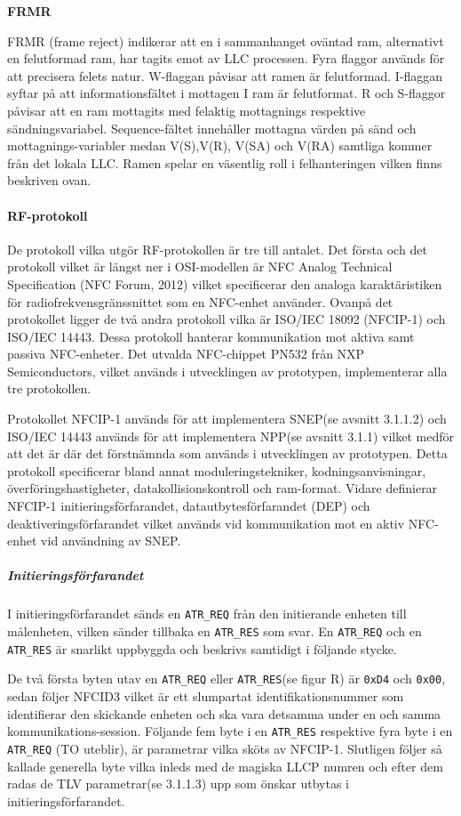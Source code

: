 \documentclass[11pt]{article}
\begin{document}

\textbf{FRMR}


FRMR (frame reject) indikerar att en i sammanhanget oväntad ram, alternativt en felutformad ram, har tagits emot av LLC processen. Fyra flaggor används för att precisera felets natur. W-flaggan påvisar att ramen är felutformad. I-flaggan syftar på att informationsfältet i mottagen I ram är felutformat. R och S-flaggor påvisar att en ram mottagits med felaktig mottagnings respektive sändningsvariabel. Sequence-fältet innehåller mottagna värden på sänd och mottagnings-variabler medan V(S),V(R), V(SA) och V(RA) samtliga kommer från det lokala LLC. Ramen spelar en väsentlig roll i felhanteringen vilken finns beskriven ovan.


\paragraph{RF-protokoll}
De protokoll vilka utgör RF-protokollen är tre till antalet. Det första och det protokoll vilket är längst ner i OSI-modellen är NFC Analog Technical Specification (NFC Forum, 2012) vilket specificerar den analoga karaktäristiken för radiofrekvensgränssnittet som en NFC-enhet använder. Ovanpå det protokollet ligger de två andra protokoll vilka är ISO/IEC 18092 (NFCIP-1) och ISO/IEC 14443. Dessa protokoll hanterar kommunikation mot aktiva samt passiva NFC-enheter. Det utvalda NFC-chippet PN532 från NXP Semiconductors, vilket används i utvecklingen av prototypen, implementerar alla tre protokollen.

Protokollet NFCIP-1 används för att implementera SNEP(se avsnitt 3.1.1.2) och ISO/IEC 14443 används för att implementera NPP(se avsnitt 3.1.1) vilket medför att det är där det förstnämnda som används i utvecklingen av prototypen. Detta protokoll specificerar bland annat moduleringstekniker, kodningsanvisningar, överföringshastigheter, datakollisionskontroll och ram-format. Vidare definierar NFCIP-1 initieringsförfarandet, datautbytesförfarandet (DEP) och deaktiveringsförfarandet vilket används vid kommunikation mot en aktiv NFC-enhet vid användning av SNEP.

\subparagraph{Initieringsförfarandet}
I initieringsförfarandet sänds en \texttt{ATR\_REQ} från den initierande enheten till målenheten, vilken sänder tillbaka en \texttt{ATR\_RES} som svar. En \texttt{ATR\_REQ} och en \texttt{ATR\_RES} är snarlikt uppbyggda och beskrivs samtidigt i följande stycke.

De två första byten utav en \texttt{ATR\_REQ} eller \texttt{ATR\_RES}(se figur R) är \texttt{0xD4} och \texttt{0x00}, sedan följer NFCID3 vilket är ett slumpartat identifikationsnummer som identifierar den skickande enheten och ska vara detsamma under en och samma kommunikations-session. Följande fem byte i en \texttt{ATR\_RES} respektive fyra byte i en \texttt{ATR\_REQ} (TO uteblir), är parametrar vilka sköts av NFCIP-1. Slutligen följer så kallade generella byte vilka inleds med de magiska LLCP numren och efter dem radas de TLV parametrar(se 3.1.1.3) upp som önskar utbytas i initieringsförfarandet.
\end{document}
